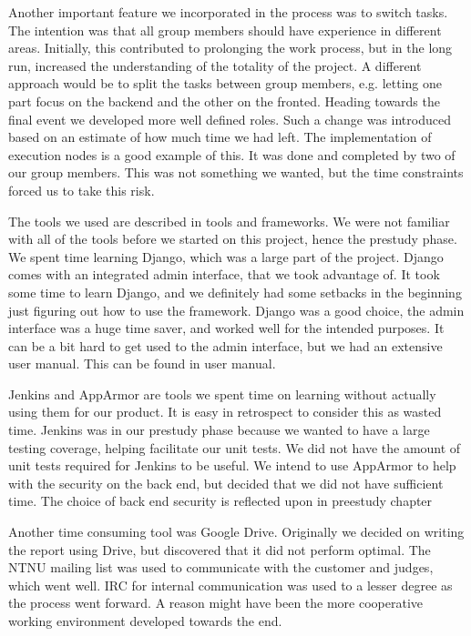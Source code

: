 Another important feature we incorporated in the process was to switch
tasks. The intention was that all group members should have experience
in different areas. Initially, this contributed to prolonging the work
process, but in the long run, increased the understanding of the
totality of the project. A different approach would be to split the
tasks between group members, e.g. letting one part focus on the backend
and the other on the fronted. Heading towards the final event we
developed more well defined roles. Such a change was introduced based
on an estimate of how much time we had left. The implementation of
execution nodes is a good example of this. It was done and completed by
two of our group members. This was not something we wanted, but the
time constraints forced us to take this risk. 

The tools we used are described in tools and frameworks. We were not
familiar with all of the tools before we started on this project, hence
the prestudy phase. We spent time learning Django, which was a large
part of the project. Django comes with an integrated admin interface,
that we took advantage of. It took some time to learn Django, and we
definitely had some setbacks in the beginning just figuring out how to
use the framework. Django was a good choice, the admin interface was a
huge time saver, and worked well for the intended purposes. It can be a
bit hard to get used to the admin interface, but we had an extensive
user manual. This can be found in user manual.

Jenkins and AppArmor are tools we spent time on learning without
actually using them for our product. It is easy in retrospect to
consider this as wasted time. Jenkins was in our prestudy phase because
we wanted to have a large testing coverage, helping facilitate our unit
tests. We did not have the amount of unit tests required for Jenkins to
be useful. We intend to use AppArmor to help with the security on the
back end, but decided that we did not have sufficient time. The choice
of back end security is reflected upon in preestudy chapter

Another time consuming tool was Google Drive. Originally we decided on
writing the report using Drive, but discovered that it did not perform
optimal. The NTNU mailing list was used to communicate with the
customer and judges, which went well. IRC for internal communication
was used to a lesser degree as the process went forward. A reason might
have been the more cooperative working environment developed towards
the end. \ 

